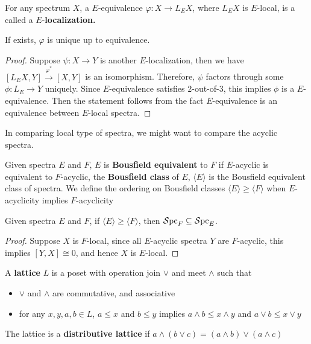 \begin{definition}
    For any spectrum $X$, a $E$-equivalence $\varphi:X\to L_{E}X$, where $L_EX$ is $E$-local, is a called a $E$-\textbf{localization.}
\end{definition}
\begin{proposition}
    If exists, $\varphi$ is unique up to equivalence.
\end{proposition}
\begin{proof}
    Suppose $\psi: X\to Y$ is another $E$-localization, then we have $[L_EX, Y]\xrightarrow{\varphi^*} [X,Y]$ is an isomorphism. Therefore, $\psi$ factors through some $\phi:L_E\to Y$ uniquely. Since $E$-equivalence satisfies $2$-out-of-$3$, this implies $\phi $ is a $E$-equivalence.  Then the statement follows from the fact $E$-equivalence is an equivalence between $E$-local spectra.
\end{proof}

In comparing local type of spectra, we might want to compare the acyclic spectra. 
\begin{definition}
    Given spectra $E$ and $F$, $E$ is \textbf{Bousfield equivalent} to $F$ if $E$-acyclic is equivalent to $F$-acyclic, the \textbf{Bousfield class} of $E$, $\langle E\rangle$ is the Bousfield equivalent class of spectra. We define the ordering on Bousfield classes $\langle E\rangle \geq \langle F\rangle$ when $E$-acyclicity implies $F$-acyclicity
\end{definition}
\begin{proposition}
    Given spectra $E$ and $F$, if $\langle E\rangle\geq \langle F\rangle$, then $\operatorname{\mathcal{S}pc}_F\subseteq \operatorname{\mathcal{S}pc}_E$.
\end{proposition}
\begin{proof}
    Suppose $X$ is $F$-local, since all $E$-acyclic spectra $Y$ are $F$-acyclic, this implies $[Y,X]\cong0$, and hence $X$ is $E$-local.
\end{proof}

\begin{definition}
    A \textbf{lattice} $L$ is a poset with operation join $\vee$ and meet $\wedge$ such that 
    \begin{itemize}
        \item $\vee$ and $\wedge$ are commutative, and associative
        \item  for any $x, y,a, b\in L$, $a\leq x$ and $b\leq y$ implies $a\wedge b\leq x\wedge y$ and $a\vee b \leq x\vee y$
    \end{itemize}
    The lattice is a \textbf{distributive lattice} if $a\wedge (b\vee c)=(a\wedge b)\vee (a\wedge c)$
\end{definition}

